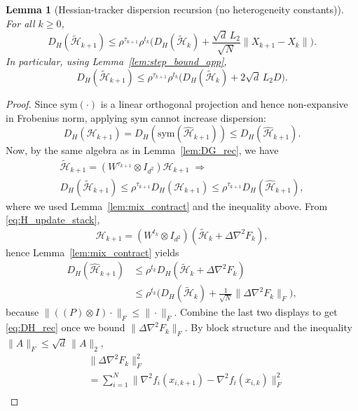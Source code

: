 \documentclass[11pt,a4paper]{article}
\def\one{1}%
\def\J{J}%
\def\Pmat{P}%
\newtheorem{lemma}[theorem]{Lemma}
\newcommand{\one}{\mathbf{1}}
\newcommand{\J}{\left(\frac{1}{N}\one\one^\top\right)}
\newcommand{\Pmat}{I-\J}
\begin{document}
\begin{lemma}[Hessian-tracker dispersion recursion (no heterogeneity constants)]\label{lem:DH_rec}
For all $k\ge0$,
\begin{equation}\label{eq:DH_rec}
D_H(\tilde{\mathcal H}_{k+1})
\le \rho^{\tau_{k+1}}\rho^{t_k}\Big(D_H(\tilde{\mathcal H}_k)+\frac{\sqrt d\,L_2}{\sqrt N}\|X_{k+1}-X_k\|\Big).
\end{equation}
In particular, using Lemma~\ref{lem:step_bound_app},
\begin{equation}\label{eq:DH_rec_const}
D_H(\tilde{\mathcal H}_{k+1})
\le \rho^{\tau_{k+1}}\rho^{t_k}\Big(D_H(\tilde{\mathcal H}_k)+2\sqrt d\,L_2D\Big).
\end{equation}
\end{lemma}
\begin{proof}
Since $\mathrm{sym}(\cdot)$ is a linear orthogonal projection and hence non-expansive in Frobenius norm,
applying $\mathrm{sym}$ cannot increase dispersion:
\[
D_H(\mathcal H_{k+1})=D_H(\mathrm{sym}(\widehat{\mathcal H}_{k+1}))\le D_H(\widehat{\mathcal H}_{k+1}).
\]
Now, by the same algebra as in Lemma~\ref{lem:DG_rec}, we have
\begin{gather*}
\tilde{\mathcal H}_{k+1}
=(W^{\tau_{k+1}}\!\otimes\! I_{d^2})\mathcal H_{k+1}\;\Rightarrow\\
D_H(\tilde{\mathcal H}_{k+1})\le \rho^{\tau_{k+1}}D_H(\mathcal H_{k+1})
\le \rho^{\tau_{k+1}}D_H(\widehat{\mathcal H}_{k+1}),
\end{gather*}
where we used Lemma~\ref{lem:mix_contract} and the inequality above.
From \eqref{eq:H_update_stack},
\[
\widehat{\mathcal H}_{k+1}\!=\!(W^{t_k}\!\otimes\! I_{d^2})(\tilde{\mathcal H}_k\!+\!\Delta\nabla^2 F_k),
\]
hence Lemma~\ref{lem:mix_contract} yields
\begin{align*}
D_H(\widehat{\mathcal H}_{k+1})
&\le \rho^{t_k}D_H(\tilde{\mathcal H}_k\!+\!\Delta\nabla^2 F_k)\\
&\le \rho^{t_k}\!\Big(D_H(\tilde{\mathcal H}_k)\!+\!\tfrac1{\sqrt N}\|\Delta\nabla^2 F_k\|_F\Big),
\end{align*}
because $\|((\Pmat)\otimes I)\cdot\|_F\le \|\cdot\|_F$.
Combine the last two displays to get \eqref{eq:DH_rec} once we bound $\|\Delta\nabla^2F_k\|_F$.
By block structure and the inequality $\|A\|_F\le \sqrt d\,\|A\|_2$,
\begin{align*}
&\|\Delta\nabla^2 F_k\|_F^2\\
&=\textstyle\sum_{i=1}^N\|\nabla^2 f_i(x_{i,k+1})\!-\!\nabla^2 f_i(x_{i,k})\|_F^2\\

\end{align*}
\end{proof}
\end{document}
